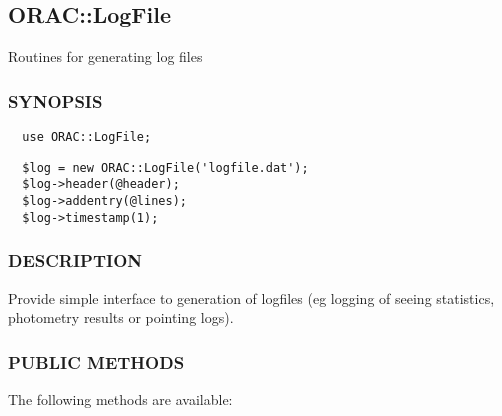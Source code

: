 \subsection{ORAC::LogFile\label{ORAC::LogFile}}

Routines for generating log files

\subsubsection*{SYNOPSIS\label{ORAC::LogFile_SYNOPSIS}}\begin{verbatim}
  use ORAC::LogFile;
\end{verbatim}
\begin{verbatim}
  $log = new ORAC::LogFile('logfile.dat');
  $log->header(@header);
  $log->addentry(@lines);
  $log->timestamp(1);
\end{verbatim}
\subsubsection*{DESCRIPTION\label{ORAC::LogFile_DESCRIPTION}}

Provide simple interface to generation of logfiles (eg logging
of seeing statistics, photometry results or pointing logs).

\subsubsection*{PUBLIC METHODS\label{ORAC::LogFile_PUBLIC_METHODS}}

The following methods are available:


